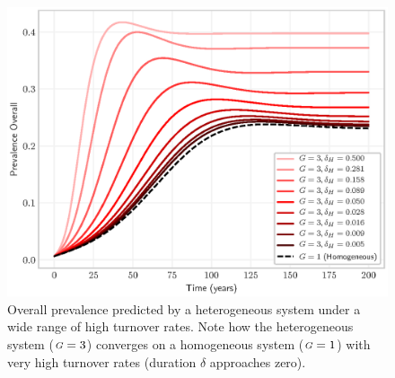 \documentclass[10pt]{article}
\newlength{\figi}  \setlength{\figi}  {0.800\textwidth}
\numberwithin{equation}{section}
\newcommand{\G}{{\mbox{\footnotesize{\textit{G}}}}}
\begin{document}
\begin{figure}
  \centering
  \includegraphics[width=\figi]{vary-zeta-prevalence-[0005,05].eps}
  \caption{Overall prevalence predicted by a heterogeneous system
    under a wide range of high turnover rates.
    Note how the heterogeneous system ($\G = 3$) converges on a homogeneous system ($\G = 1$)
    with very high turnover rates (duration $\delta$ approaches zero).}
  \label{fig:prev-converge}
\end{figure}
\end{document}
